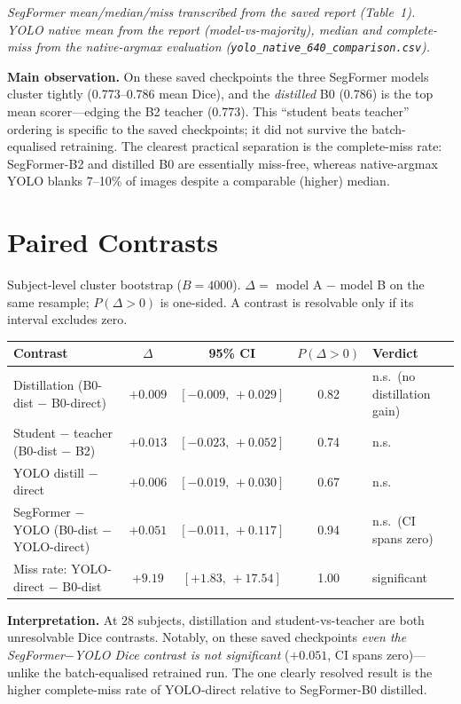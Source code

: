 \documentclass[11pt]{article}
\begin{document}
\textit{\small SegFormer mean/median/miss transcribed from the saved report (Table~1).
YOLO native mean from the report (model-vs-majority), median and complete-miss from the
native-argmax evaluation (\texttt{yolo\_native\_640\_comparison.csv}).}

\textbf{Main observation.}
On these saved checkpoints the three SegFormer models cluster tightly (0.773--0.786 mean
Dice), and the \emph{distilled} B0 (0.786) is the top mean scorer---edging the B2 teacher
(0.773). This ``student beats teacher'' ordering is specific to the saved checkpoints; it
did not survive the batch-equalised retraining. The clearest practical separation is the
complete-miss rate: SegFormer-B2 and distilled B0 are essentially miss-free, whereas
native-argmax YOLO blanks 7--10\% of images despite a comparable (higher) median.

\section{Paired Contrasts}

Subject-level cluster bootstrap ($B=4000$). $\Delta = $ model A $-$ model B on the same
resample; $P(\Delta>0)$ is one-sided. A contrast is resolvable only if its interval
excludes zero.

\begin{center}
\begin{tabular}{l c c c l}
\toprule
Contrast & $\Delta$ & 95\% CI & $P(\Delta>0)$ & Verdict \\
\midrule
Distillation (B0-dist $-$ B0-direct)        & $+0.009$ & $[-0.009,\,+0.029]$ & 0.82 & n.s.\ (no distillation gain) \\
Student $-$ teacher (B0-dist $-$ B2)         & $+0.013$ & $[-0.023,\,+0.052]$ & 0.74 & n.s. \\
YOLO distill $-$ direct                      & $+0.006$ & $[-0.019,\,+0.030]$ & 0.67 & n.s. \\
SegFormer $-$ YOLO (B0-dist $-$ YOLO-direct) & $+0.051$ & $[-0.011,\,+0.117]$ & 0.94 & n.s.\ (CI spans zero) \\
Miss rate: YOLO-direct $-$ B0-dist          & $+9.19$  & $[+1.83,\,+17.54]$  & 1.00 & significant \\
\bottomrule
\end{tabular}
\end{center}

\textbf{Interpretation.}
At 28 subjects, distillation and student-vs-teacher are both unresolvable Dice contrasts.
Notably, on these saved checkpoints \emph{even the SegFormer$-$YOLO Dice contrast is not
significant} ($+0.051$, CI spans zero)---unlike the batch-equalised retrained run. The one
clearly resolved result is the higher complete-miss rate of YOLO-direct relative to
SegFormer-B0 distilled.
\end{document}
